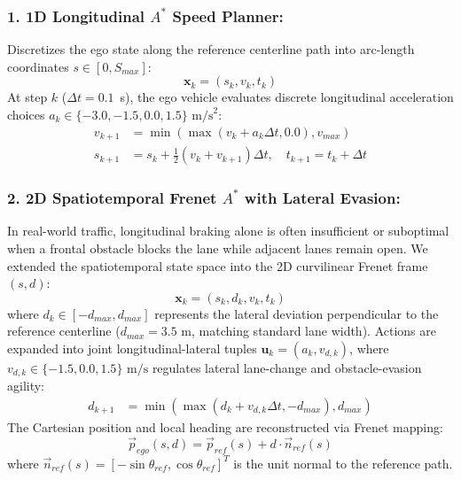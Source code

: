 \documentclass[runningheads]{llncs}
\begin{document}
\subsubsection{1. 1D Longitudinal $A^*$ Speed Planner:}
Discretizes the ego state along the reference centerline path into arc-length coordinates $s \in [0, S_{max}]$:
\begin{equation}
\mathbf{x}_k = (s_k, v_k, t_k)
\end{equation}
At step $k$ ($\Delta t = 0.1$~s), the ego vehicle evaluates discrete longitudinal acceleration choices $a_k \in \{-3.0, -1.5, 0.0, 1.5\} \text{ m/s}^2$:
\begin{align}
v_{k+1} &= \min(\max(v_k + a_k \Delta t, 0.0), v_{max}) \\
s_{k+1} &= s_k + \frac{1}{2}(v_k + v_{k+1})\Delta t, \quad t_{k+1} = t_k + \Delta t
\end{align}

\subsubsection{2. 2D Spatiotemporal Frenet $A^*$ with Lateral Evasion:}
In real-world traffic, longitudinal braking alone is often insufficient or suboptimal when a frontal obstacle blocks the lane while adjacent lanes remain open. We extended the spatiotemporal state space into the 2D curvilinear Frenet frame $(s, d)$:
\begin{equation}
\mathbf{x}_k = (s_k, d_k, v_k, t_k)
\end{equation}
where $d_k \in [-d_{max}, d_{max}]$ represents the lateral deviation perpendicular to the reference centerline ($d_{max} = 3.5\text{ m}$, matching standard lane width). Actions are expanded into joint longitudinal-lateral tuples $\mathbf{u}_k = (a_k, v_{d,k})$, where $v_{d,k} \in \{-1.5, 0.0, 1.5\} \text{ m/s}$ regulates lateral lane-change and obstacle-evasion agility:
\begin{align}
d_{k+1} &= \min(\max(d_k + v_{d,k} \Delta t, -d_{max}), d_{max})
\end{align}
The Cartesian position and local heading are reconstructed via Frenet mapping:
\begin{equation}
\vec{p}_{ego}(s, d) = \vec{p}_{ref}(s) + d \cdot \vec{n}_{ref}(s)
\end{equation}
where $\vec{n}_{ref}(s) = [-\sin\theta_{ref}, \cos\theta_{ref}]^T$ is the unit normal to the reference path.
\end{document}
